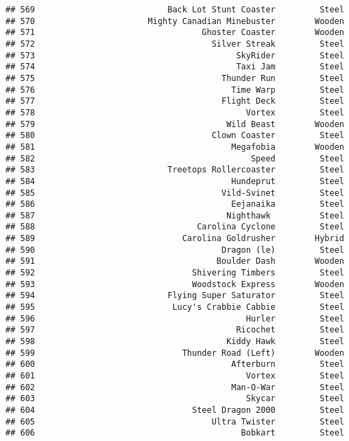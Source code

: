 \documentclass[
]{article}
\begin{document}
\begin{verbatim}
## 569                           Back Lot Stunt Coaster         Steel
## 570                       Mighty Canadian Minebuster        Wooden
## 571                                  Ghoster Coaster        Wooden
## 572                                    Silver Streak         Steel
## 573                                         SkyRider         Steel
## 574                                         Taxi Jam         Steel
## 575                                      Thunder Run         Steel
## 576                                        Time Warp         Steel
## 577                                      Flight Deck         Steel
## 578                                           Vortex         Steel
## 579                                       Wild Beast        Wooden
## 580                                    Clown Coaster         Steel
## 581                                        Megafobia        Wooden
## 582                                            Speed         Steel
## 583                           Treetops Rollercoaster         Steel
## 584                                        Hundeprut         Steel
## 585                                      Vild-Svinet         Steel
## 586                                        Eejanaika         Steel
## 587                                       Nighthawk          Steel
## 588                                 Carolina Cyclone         Steel
## 589                              Carolina Goldrusher        Hybrid
## 590                                      Dragon (le)         Steel
## 591                                     Boulder Dash        Wooden
## 592                                Shivering Timbers         Steel
## 593                                Woodstock Express        Wooden
## 594                           Flying Super Saturator         Steel
## 595                            Lucy's Crabbie Cabbie         Steel
## 596                                           Hurler         Steel
## 597                                         Ricochet         Steel
## 598                                       Kiddy Hawk         Steel
## 599                              Thunder Road (Left)        Wooden
## 600                                        Afterburn         Steel
## 601                                           Vortex         Steel
## 602                                        Man-O-War         Steel
## 603                                           Skycar         Steel
## 604                                Steel Dragon 2000         Steel
## 605                                    Ultra Twister         Steel
## 606                                          Bobkart         Steel

\end{verbatim}
\end{document}
